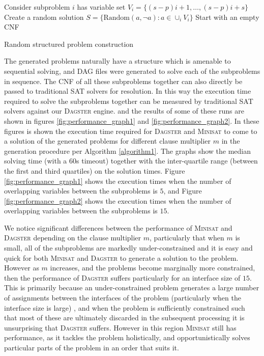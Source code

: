 \documentclass[
10pt, %
a4paper, %
oneside, %
headinclude,footinclude, %
BCOR5mm, %
]{scrartcl}
\begin{document}
\begin{algorithm}[H]
\SetAlgoLined
{}
 Consider subproblem $i$ has variable set $V_i=\{(s-p)i+1,\dots,(s-p)i+s\}$\;
 Create a random solution $S = \{\text{Random}(a,\lnot a) : a\in\cup_i V_i\}$\;
 Start with an empty CNF\;
 \caption{Random structured problem construction}\label{algorithm1}
\end{algorithm}

The generated problems naturally have a structure which is amenable to sequential solving, and DAG files were generated to solve each of the subproblems in sequence.
The CNF of all these subproblems together can also directly be passed to traditional SAT solvers for resolution.
In this way the execution time required to solve the subproblems together can be measured by traditional SAT solvers against our \textsc{Dagster} engine.
and the results of some of these runs are shown in figures \ref{fig:performance_graph1} and \ref{fig:performance_graph2}.
In these figures is shown the execution time required for \textsc{Dagster} and \textsc{Minisat} to come to a solution of the generated problems for different clause multiplier $m$ in the generation
procedure per Algorithm \ref{algorithm1}.
The graphs show the median solving time (with a 60s timeout) together with the inter-quartile range (between the first and third quartiles) on the solution times.
Figure \ref{fig:performance_graph1} shows the execution times when the number of overlapping variables between the subproblems is $5$, and Figure \ref{fig:performance_graph2} shows the execution times when the
number of overlapping variables between the subproblems is $15$.

We notice significant differences between the performance of \textsc{Minisat} and \textsc{Dagster} depending on the clause multiplier $m$, particularly that when $m$ is small, all of the
subproblems are markedly under-constrained and it is easy and quick for both \textsc{Minisat} and \textsc{Dagster} to generate a solution to the problem.
However as $m$ increases, and the problems become marginally more constrained, then the performance of \textsc{Dagster} suffers particularly for an interface size of $15$.
This is primarily because an under-constrained problem generates a large number of assignments between the interfaces of the problem (particularly when the interface size is large)
, and when the problem is sufficiently constrained such that most of these are ultimately discarded in the subsequent processing it is unsurprising that \textsc{Dagster} suffers.
However in this region \textsc{Minisat} still has performance, as it tackles the problem holistically, and opportunistically solves particular parts of the problem in an order that suits it.
\end{document}
